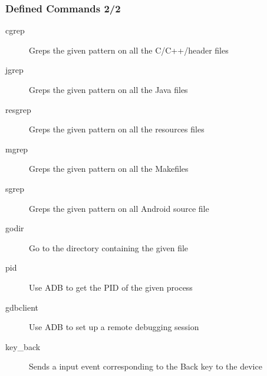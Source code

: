 \begin{frame}
  \frametitle{Defined Commands 2/2}
  \begin{description}
  \item[cgrep] Greps the given pattern on all the C/C++/header files
  \item[jgrep] Greps the given pattern on all the Java files
  \item[resgrep] Greps the given pattern on all the resources files
  \item[mgrep] Greps the given pattern on all the Makefiles
  \item[sgrep] Greps the given pattern on all Android source file
  \item[godir] Go to the directory containing the given file
  \item[pid] Use ADB to get the PID of the given process
  \item[gdbclient] Use ADB to set up a remote debugging session
  \item[key\_back] Sends a input event corresponding to the Back
    key to the device
  \end{description}
\end{frame}
